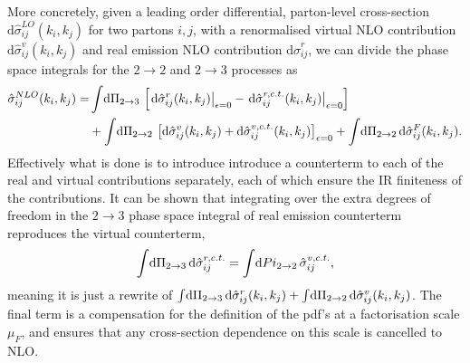 \documentclass[../main.tex]{subfiles}
\begin{document}
More concretely, given a leading order differential, parton-level cross-section \(\mathrm{d}\hat\sigma_{ij}^{LO}(k_i, k_j)\) for two partons \(i,j\), with a renormalised virtual NLO contribution \(\mathrm{d}\hat\sigma_{ij}^v(k_i, k_j)\) and real emission NLO contribution \(\mathrm{d}\hat\sigma_{ij}^r\), we can divide the phase space integrals for the \(2 \to 2\) and \(2 \to 3\) processes as
\begin{align}
  \nonumber
  \hat\sigma_{ij}^{NLO}(k_i, k_j) = & \int \!\mathrm{d}\Pi_{2\to 3}\, \left[\left.\mathrm{d}\hat\sigma_{ij}^r(k_i,k_j)\right|_{\epsilon=0} - \left.\mathrm{d}\hat\sigma_{ij}^{r, c.t.}(k_i,k_j)\right|_{{\epsilon=0}}\right]                                         \\
                                    & + \int \!\mathrm{d}\Pi_{2\to 2}\, \left[\mathrm{d}\hat\sigma_{ij}^v(k_i,k_j) + \mathrm{d}\hat\sigma_{ij}^{v, c.t.}(k_i,k_j)\right]_{\epsilon = 0} + \int \!\mathrm{d}\Pi_{2\to 2}\, \mathrm{d}\hat\sigma_{ij}^{F}(k_i, k_j).
\end{align}
Effectively what is done is to introduce introduce a counterterm to each of the real and virtual contributions separately, each of which ensure the IR finiteness of the contributions.
It can be shown that integrating over the extra degrees of freedom in the \(2 \to 3\) phase space integral of real emission counterterm reproduces the virtual counterterm,
\begin{align}
  \int \!\mathrm{d}\Pi_{2\to 3}\, \mathrm{d}\hat\sigma_{ij}^{r,c.t.} = \int \!\mathrm{d}Pi_{2 \to 2}\, \hat\sigma_{ij}^{v,c.t.},
\end{align}
meaning it is just a rewrite of \(\int \!\mathrm{d}\Pi_{2 \to 3}\, \mathrm{d}\hat\sigma_{ij}^r(k_i,k_j) + \int \!\mathrm{d}\Pi_{2 \to 2}\, \mathrm{d}\hat\sigma_{ij}^v(k_i,k_j)\).
The final term is a compensation for the definition of the pdf's at a factorisation scale \(\mu_F\), and ensures that any cross-section dependence on this scale is cancelled to NLO.
\end{document}
